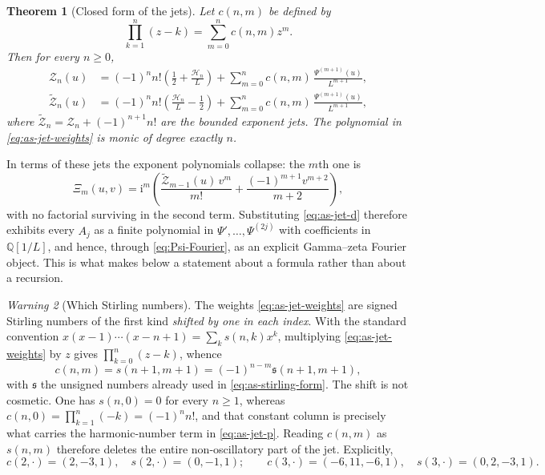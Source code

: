 \documentclass[11pt,oneside]{article}
\newtheorem{theorem}{Theorem}[section]
\theoremstyle{definition}
\theoremstyle{remark}
\newtheorem{warning}[theorem]{Warning}
\newcommand{\Q}{\mathbb Q}
\newcommand{\ii}{\mathrm i}
\begin{document}
\begin{theorem}[Closed form of the jets]
\label{thm:as-jet-closed-form}
Let $c(n,m)$ be defined by
\begin{equation}
 \prod_{k=1}^{n}(z-k)=\sum_{m=0}^{n}c(n,m)z^{m}.          \label{eq:as-jet-weights}
\end{equation}
Then for every $n\ge0$,
\begin{align}
 \mathcal Z_{n}(u)&=(-1)^{n}n!\left(\frac12+\frac{\mathcal H_n}{L}\right)
   +\sum_{m=0}^{n}c(n,m)\,\frac{\Psi^{(m+1)}(u)}{L^{m+1}},  \label{eq:as-jet-p}\\
 \widetilde{\mathcal Z}_{n}(u)&=(-1)^{n}n!\left(\frac{\mathcal H_n}{L}-\frac12\right)
   +\sum_{m=0}^{n}c(n,m)\,\frac{\Psi^{(m+1)}(u)}{L^{m+1}},  \label{eq:as-jet-d}
\end{align}
where $\widetilde{\mathcal Z}_{n}=\mathcal Z_{n}+(-1)^{n+1}n!$ are the bounded exponent jets.  The polynomial in
\eqref{eq:as-jet-weights} is monic of degree exactly $n$.
\end{theorem}

In terms of these jets the exponent polynomials collapse: the $m$th one is
\begin{equation}
 \Xi_m(u,v)=\ii^{m}\left(\frac{\widetilde{\mathcal Z}_{m-1}(u)\,v^{m}}{m!}
   +\frac{(-1)^{m+1}v^{m+2}}{m+2}\right),                  \label{eq:as-exponent-collapse}
\end{equation}
with no factorial surviving in the second term.  Substituting
\eqref{eq:as-jet-d} therefore exhibits every $A_j$ as a finite polynomial in
$\Psi',\ldots,\Psi^{(2j)}$ with coefficients in $\Q[1/L]$, and hence, through
\eqref{eq:Psi-Fourier}, as an explicit Gamma--zeta Fourier object.  This is what makes
 below a statement about a formula rather than about a
recursion.

\begin{warning}[Which Stirling numbers]
\label{warn:as-stirling-shift}
The weights \eqref{eq:as-jet-weights} are signed Stirling numbers of the first kind
\emph{shifted by one in each index}.  With the standard convention
$x(x-1)\cdots(x-n+1)=\sum_k s(n,k)x^k$, multiplying \eqref{eq:as-jet-weights} by $z$ gives
$\prod_{k=0}^{n}(z-k)$, whence
\begin{equation}
 c(n,m)=s(n+1,m+1)=(-1)^{n-m}\mathfrak s(n+1,m+1),         \label{eq:as-stirling-shift}
\end{equation}
with $\mathfrak s$ the unsigned numbers already used in \eqref{eq:as-stirling-form}.  The
shift is not cosmetic.  One has $s(n,0)=0$ for every $n\ge1$, whereas
$c(n,0)=\prod_{k=1}^{n}(-k)=(-1)^{n}n!$, and that constant column is precisely what carries
the harmonic-number term in \eqref{eq:as-jet-p}.  Reading $c(n,m)$ as $s(n,m)$ therefore
deletes the entire non-oscillatory part of the jet.  Explicitly,
\begin{equation*}
 c(2,\cdot)=(2,-3,1),\quad s(2,\cdot)=(0,-1,1);
 \qquad
 c(3,\cdot)=(-6,11,-6,1),\quad s(3,\cdot)=(0,2,-3,1).
\end{equation*}
\end{warning}
\end{document}
